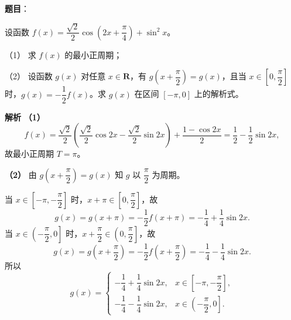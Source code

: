 \begin{answer}

\textbf{题目}：

设函数 $f(x)=\dfrac{\sqrt2}2\cos\left(2x+\dfrac\pi4\right)+\sin^2x$。

（1） 求 $f(x)$ 的最小正周期；

（2） 设函数 $g(x)$ 对任意 $x\in\mathbf R$，有 $g\left(x+\dfrac\pi2\right)=g(x)$，且当 $x\in\left[0,\dfrac\pi2\right]$ 时，$g(x)=-\dfrac12f(x)$。求 $g(x)$ 在区间 $[-\pi,0]$ 上的解析式。

\textbf{解析}
\textbf{（1）}
\nopagebreak[4]
\[f(x)=\frac{\sqrt2}2\left(\frac{\sqrt2}2\cos2x-\frac{\sqrt2}2\sin2x\right)+\frac{1-\cos2x}2=\frac12-\frac12\sin2x,\]
故最小正周期 $T=\pi$。

\textbf{（2）} 由 $g\left(x+\dfrac\pi2\right)=g(x)$ 知 $g$ 以 $\dfrac\pi2$ 为周期。

当 $x\in\left[-\pi,-\dfrac\pi2\right]$ 时，$x+\pi\in\left[0,\dfrac\pi2\right]$，故
\nopagebreak[4]
\[g(x)=g(x+\pi)=-\frac12f(x+\pi)=-\frac14+\frac14\sin2x.\]
当 $x\in\left(-\dfrac\pi2,0\right]$ 时，$x+\dfrac\pi2\in\left(0,\dfrac\pi2\right]$，故
\nopagebreak[4]
\[g(x)=g\left(x+\frac\pi2\right)=-\frac12f\left(x+\frac\pi2\right)=-\frac14-\frac14\sin2x.\]
所以
\nopagebreak[4]
\[g(x)=\begin{cases}-\dfrac14+\dfrac14\sin2x,&x\in\left[-\pi,-\dfrac\pi2\right],\\[6pt]-\dfrac14-\dfrac14\sin2x,&x\in\left(-\dfrac\pi2,0\right].\end{cases}\]


\gkanswer{答案（2）：$g(x)=\begin{cases}-\dfrac14+\dfrac14\sin2x,&x\in\left[-\pi,-\dfrac\pi2\right],\\[6pt]-\dfrac14-\dfrac14\sin2x,&x\in\left(-\dfrac\pi2,0\right].\end{cases}$}

\end{answer}
